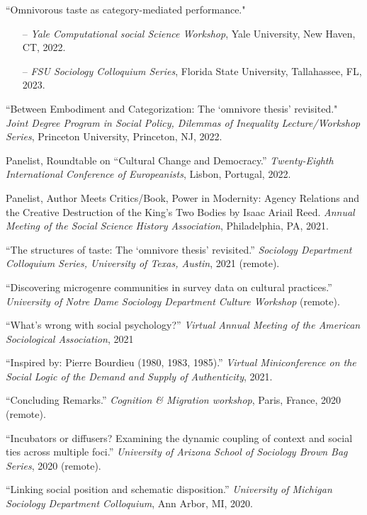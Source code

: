 \ind ``Omnivorous taste as category-mediated performance."  
\begin{itemize}[leftmargin=0.8in, topsep = 0pt]
	\setlength\itemsep{-0.55em}
	\item[--] {\em Yale Computational social Science Workshop}, Yale University, New Haven, CT, 2022.
	\item[--] {\em FSU Sociology Colloquium Series}, Florida State University, Tallahassee, FL, 2023.
\end{itemize}

\ind ``Between Embodiment and Categorization: The `omnivore thesis' revisited." {\em Joint Degree Program in Social Policy, Dilemmas of Inequality Lecture/Workshop Series}, Princeton University, Princeton, NJ, 2022. 

\ind Panelist, Roundtable on ``Cultural Change and Democracy.'' {\em Twenty-Eighth International Conference of Europeanists}, Lisbon, Portugal, 2022. 

\ind Panelist, Author Meets Critics/Book, Power in Modernity: Agency Relations and the Creative Destruction of the King's Two Bodies by Isaac Ariail Reed. {\em Annual Meeting of the Social Science History Association}, Philadelphia, PA, 2021.

\ind ``The structures of taste: The `omnivore thesis' revisited.'' {\em Sociology Department Colloquium Series, University of Texas, Austin}, 2021 (remote). 

\ind ``Discovering microgenre communities in survey data on cultural practices.'' {\em University of Notre Dame Sociology Department Culture Workshop} (remote).

\ind ``What's wrong with social psychology?'' {\em Virtual Annual Meeting of the American Sociological Association}, 2021

\ind ``Inspired by: Pierre Bourdieu (1980, 1983, 1985).'' {\em Virtual Miniconference on the Social Logic of the Demand and Supply of Authenticity}, 2021.

\ind ``Concluding Remarks.'' {\em Cognition \& Migration workshop}, Paris, France, 2020 (remote).

\ind ``Incubators or diffusers? Examining the dynamic coupling of context and social ties across multiple foci.'' {\em University of Arizona School of Sociology Brown Bag Series},  2020 (remote).

\ind ``Linking social position and schematic disposition.'' {\em University of Michigan Sociology Department Colloquium}, Ann Arbor, MI, 2020.

